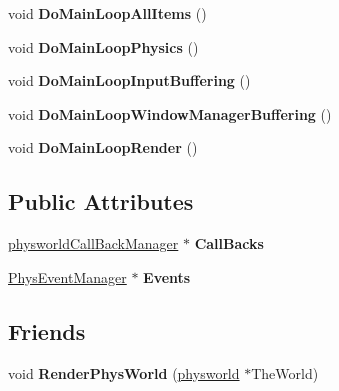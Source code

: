 \begin{DoxyCompactItemize}
\item 
\hypertarget{classphysworld_adbfee9bf8194be50e954f68f0d34e713}{
void {\bfseries DoMainLoopAllItems} ()}
\label{d5/d35/classphysworld_adbfee9bf8194be50e954f68f0d34e713}

\item 
\hypertarget{classphysworld_ab620e6e174bfb30ee5f91d4b1988fe80}{
void {\bfseries DoMainLoopPhysics} ()}
\label{d5/d35/classphysworld_ab620e6e174bfb30ee5f91d4b1988fe80}

\item 
\hypertarget{classphysworld_ab2748ae34529065bc45c0437619702a2}{
void {\bfseries DoMainLoopInputBuffering} ()}
\label{d5/d35/classphysworld_ab2748ae34529065bc45c0437619702a2}

\item 
\hypertarget{classphysworld_afc7460b9da2f5b83e2a5a14af364fe5f}{
void {\bfseries DoMainLoopWindowManagerBuffering} ()}
\label{d5/d35/classphysworld_afc7460b9da2f5b83e2a5a14af364fe5f}

\item 
\hypertarget{classphysworld_a645d066ce4733ae7cef4b60a670f47ec}{
void {\bfseries DoMainLoopRender} ()}
\label{d5/d35/classphysworld_a645d066ce4733ae7cef4b60a670f47ec}

\end{DoxyCompactItemize}
\subsection*{Public Attributes}
\begin{DoxyCompactItemize}
\item 
\hypertarget{classphysworld_a273ddd0ecdabc8b9b6570e10cf916040}{
\hyperlink{classphysworldCallBackManager}{physworldCallBackManager} $\ast$ {\bfseries CallBacks}}
\label{d5/d35/classphysworld_a273ddd0ecdabc8b9b6570e10cf916040}

\item 
\hypertarget{classphysworld_ae024208c753dead33c37ff0c76a56990}{
\hyperlink{classPhysEventManager}{PhysEventManager} $\ast$ {\bfseries Events}}
\label{d5/d35/classphysworld_ae024208c753dead33c37ff0c76a56990}

\end{DoxyCompactItemize}
\subsection*{Friends}
\begin{DoxyCompactItemize}
\item 
\hypertarget{classphysworld_af58ba268fb328e7e5de6c036e259fa92}{
void {\bfseries RenderPhysWorld} (\hyperlink{classphysworld}{physworld} $\ast$TheWorld)}
\label{d5/d35/classphysworld_af58ba268fb328e7e5de6c036e259fa92}

\end{DoxyCompactItemize}


